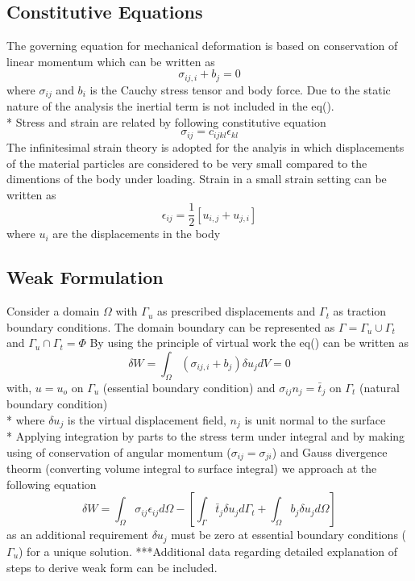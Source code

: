 \documentclass[12pt]{article}
\begin{document}
\subsection{Constitutive Equations}
The governing equation for mechanical deformation is based on conservation of linear momentum which can be written as
\begin{equation}
\sigma_{ij,i} + b_j = 0
\end{equation}
where $ \sigma_{ij} $ and $ b_i $ is the Cauchy stress tensor and body force. Due to the static nature of the analysis the inertial term is not included in the eq().\\*
Stress and strain are related by following constitutive equation
\begin{equation}
\sigma_{ij} = c_{ijkl} \epsilon_{kl}
\end{equation}
The infinitesimal strain theory is adopted for the analyis in which displacements of the material particles are considered to be very small compared to the dimentions of the body under loading. Strain in a small strain setting can be written as
\begin{equation}
\epsilon_{ij}=\frac{1}{2}[u_{i,j}+u_{j,i}]
\end{equation}
where $ u_{i} $ are the displacements in the body


\subsection{Weak Formulation}
Consider a domain $\Omega$ with $\Gamma_u$ as prescribed displacements and $\Gamma_t$ as traction boundary conditions. The domain boundary can be represented as $\Gamma = \Gamma_u \cup \Gamma_t$ and $\Gamma_u \cap \Gamma_t = \Phi$
By using the principle of virtual work the eq() can be written as
\begin{equation}
\delta W = \int_\Omega (\sigma_{ij,i} + b_j ) \delta u_j dV = 0
\end{equation} 
with,
$u = u_o$ on $\Gamma_u$ (essential boundary condition) and
$\sigma_{ij}n_j = \bar{t}_j$ on $\Gamma_t$ (natural boundary condition) \\*
where $\delta u_j$ is the virtual displacement field, $n_j$ is unit normal to the surface \\*
Applying integration by parts to the stress term under integral and by making using of conservation of angular momentum ($ \sigma_{ij} = \sigma_{ji} $) and Gauss divergence theorm (converting volume integral to surface integral) we approach at the following equation
\begin{equation} \label{FinalWeakform}
\delta W = \int_{\Omega} \sigma_{ij} \epsilon_{ij} d\Omega - \left[ \int_{\Gamma} \bar{t}_j \delta u_j d\Gamma_t  + \int_{\Omega} b_j \delta u_j d\Omega \right]
\end{equation}
as an additional requirement $\delta u_j$ must be zero at essential boundary conditions ($\Gamma_u$) for a unique solution.
***Additional data regarding detailed explanation of steps to derive weak form can be included.
\end{document}
